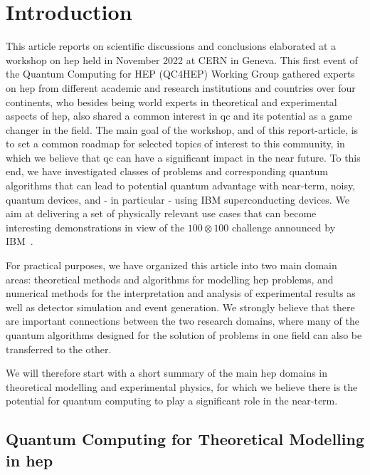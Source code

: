 \section{Introduction}
\label{Introduction}

This article reports on scientific discussions and conclusions elaborated at a workshop on \gls{hep} held in November 2022 at CERN in Geneva.
This first event of the Quantum Computing for HEP (QC4HEP) Working Group gathered experts on \gls{hep} from different academic and research institutions and countries over four continents, who besides being world experts in theoretical and experimental aspects of \gls{hep}, also shared a common interest in \gls{qc} and its potential as a game changer in the field. 
The main goal of the workshop, and of this report-article, is to set a common roadmap for selected topics of interest to this community, in which we believe that \gls{qc} can have a significant impact in the near future. 
To this end, we have investigated classes of problems and corresponding quantum algorithms that can lead to potential quantum advantage with near-term, noisy, quantum devices, and - in particular - using IBM superconducting devices. We aim at delivering a set of physically relevant use cases that can become interesting %
demonstrations in view of the $100 \otimes 100$ challenge announced by IBM~\cite{IBM_100by100}. 

For practical purposes, we have organized this article into two main domain areas: theoretical methods and algorithms for modelling \gls{hep} problems, and numerical methods for the interpretation and analysis of experimental results as well as detector simulation and event generation. 
We strongly believe that there are important connections between the two research domains, where many of the quantum algorithms designed for the solution of problems in one field can also be transferred to the other. 

We will therefore start with a short summary of the main \gls{hep} domains in theoretical modelling and experimental physics, for which we believe there is the potential for quantum computing to play a significant role in the near-term.  


\subsection{Quantum Computing for Theoretical Modelling in \gls{hep}}

